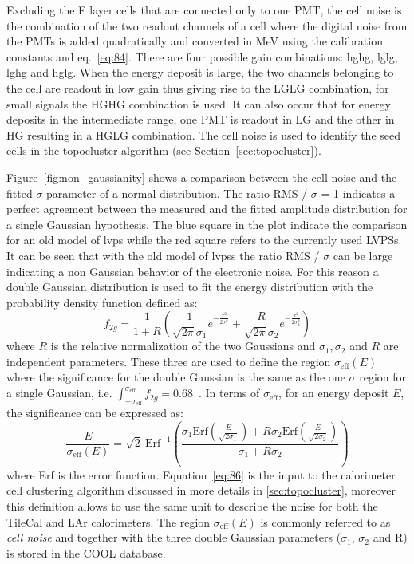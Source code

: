 Excluding the E layer cells that are connected only to one PMT, the cell noise
is the combination of the two readout channels of a cell where the digital noise
from the PMTs is added quadratically and converted in MeV using the calibration
constants and eq.~\eqref{eq:84}. There are four possible gain combinations:
\gls{hghg}, \gls{lglg}, \gls{lghg} and \gls{hglg}. When the energy deposit is
large, the two channels belonging to the cell are readout in low gain thus
giving rise to the LGLG combination, for small signals the HGHG combination is
used. It can also occur that for energy deposits in the intermediate range, one
PMT is readout in LG and the other in HG resulting in a HGLG combination. The
cell noise is used to identify the seed cells in the topocluster algorithm (see
Section~\ref{sec:topocluster}).

Figure~\ref{fig:non_gaussianity} shows a comparison between the cell noise and
the fitted $\sigma$ parameter of a normal distribution. The ratio RMS / $\sigma$
= 1 indicates a perfect agreement between the measured and the fitted amplitude
distribution for a single Gaussian hypothesis. The blue square in the plot
indicate the comparison for an old model of \gls{lvps} while the red square
refers to the currently used LVPSs. It can be seen that with the old model of
\glspl{lvps} the ratio RMS / $\sigma$ can be large indicating a non Gaussian
behavior of the electronic noise. For this reason a double Gaussian distribution
is used to fit the energy distribution with the probability density function
defined as:
\begin{equation}
  \label{eq:85}
  f_{2g} = \frac{1}{1 + R} \left( \frac{1}{\sqrt{2 \pi} \sigma_1} e^{-
      \frac{x^2}{2 \sigma_1^2}} + \frac{R}{\sqrt{2 \pi} \sigma_2} e^{-
      \frac{x^2}{2 \sigma_2^2}} \right)
\end{equation}
where $R$ is the relative normalization of the two Gaussians and
$\sigma_1, \sigma_2$ and $R$ are independent parameters. These three are used to
define the region $\sigma_{\text{eff}}(E)$ where the significance for the double
Gaussian is the same as the one $\sigma$ region for a single Gaussian,
i.e.
$\int_{- \sigma_{\text{eff}}}^{\sigma_{\text{eff}}} f_{2g} =
0.68$~\cite{TileReadiness}.
In terms of $\sigma_{\text{eff}}$, for an energy deposit $E$, the significance
can be expressed as:
\begin{equation}
  \label{eq:86}
  \frac{E}{\sigma_{\text{eff}}(E)} = \sqrt{2}\ \text{Erf}^{- 1} \left( \frac{\sigma_1
      \text{Erf} \left(\frac{E}{\sqrt{2 \sigma_1}} \right) + R \sigma_2 \text{Erf}
    \left( \frac{E}{\sqrt{2 \sigma_2}} \right)}{\sigma_1 + R \sigma_2} \right)
\end{equation}
where Erf is the error function. Equation~\ref{eq:86} is the input to the
calorimeter cell clustering algorithm discussed in more details in
\cref{sec:topocluster}, moreover this definition allows to use the same unit to
describe the noise for both the TileCal and LAr calorimeters. The region
$\sigma_{\text{eff}}(E)$ is commonly referred to as \emph{cell noise} and
together with the three double Gaussian parameters ($\sigma_1$, $\sigma_2$ and
R) is stored in the COOL database.

